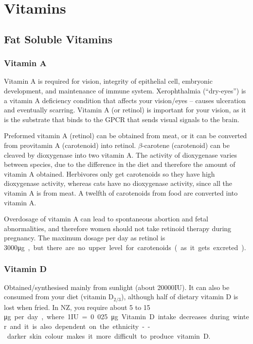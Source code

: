 \section{Vitamins}

\subsection{Fat Soluble Vitamins}

\subsubsection{Vitamin A}

Vitamin A is required for vision, integrity of epithelial cell, embryonic development, and  maintenance of immune system.
Xerophthalmia (``dry-eyes'') is a vitamin A deficiency condition that affects your vision/eyes -- causes ulceration and eventually scarring.
Vitamin A (or retinol) is important for your vision, as it is the substrate that binds to the GPCR that sends visual signals to the brain.

Preformed vitamin A (retinol) can be obtained from meat, or it can be converted from provitamin A (carotenoid) into retinol.
$\beta$-carotene (carotenoid) can be cleaved by dioxygenase into two vitamin A.
The activity of dioxygenase varies between species, due to the difference in the diet and therefore the amount of vitamin A obtained.
Herbivores only get carotenoids so they have high dioxygenase activity, whereas cats have no dioxygenase activity, since all the vitamin A is from meat.
A twelfth of carotenoids from food are converted into vitamin A.

Overdosage of vitamin A can lead to spontaneous abortion and fetal abnormalities, and therefore women should not take retinoid therapy during pregnancy.
The maximum dosage per day as retinol is 3000\si\micro g, but there are no upper level for carotenoids (as it gets excreted).

\subsubsection{Vitamin D}

Obtained/synthesised mainly from sunlight (about 20000IU).
It can also be consumed from your diet (vitamin D$_{2/3}$), although half of dietary vitamin D is lost when fried.
In NZ, you require about 5 to 15 \si\micro g per day, where 1IU = 0.025\si\micro g.
Vitamin D intake decreases during winter and it is also dependent on the ethnicity -- darker skin colour makes it more difficult to produce vitamin D.

